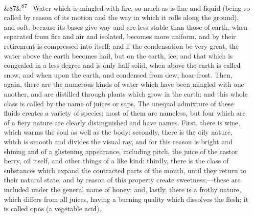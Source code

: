 \documentclass[12pt]{article}
\newcommand{\para}[1][]{\par\noindent\ifx&#1&\else\textsuperscript{\footnotesize #1}~\fi}
\begin{document}
\para[87] Water which is mingled with fire, so much as is fine and liquid (being so called by reason of its motion and the way in which it rolls along the ground), and soft, because its bases give way and are less stable than those of earth, when separated from fire and air and isolated, becomes more uniform, and by their retirement is compressed into itself; and if the condensation be very great, the water above the earth becomes hail, but on the earth, ice; and that which is congealed in a less degree and is only half solid, when above the earth is called snow, and when upon the earth, and condensed from dew, hoar-frost. Then, again, there are the numerous kinds of water which have been mingled with one another, and are distilled through plants which grow in the earth; and this whole class is called by the name of juices or saps. The unequal admixture of these fluids creates a variety of species; most of them are nameless, but four which are of a fiery nature are clearly distinguished and have names. First, there is wine, which warms the soul as well as the body: secondly, there is the oily nature, which is smooth and divides the visual ray, and for this reason is bright and shining and of a glistening appearance, including pitch, the juice of the castor berry, oil itself, and other things of a like kind: thirdly, there is the class of substances which expand the contracted parts of the mouth, until they return to their natural state, and by reason of this property create sweetness;---these are included under the general name of honey: and, lastly, there is a frothy nature, which differs from all juices, having a burning quality which dissolves the flesh; it is called opos (a vegetable acid).
\end{document}

